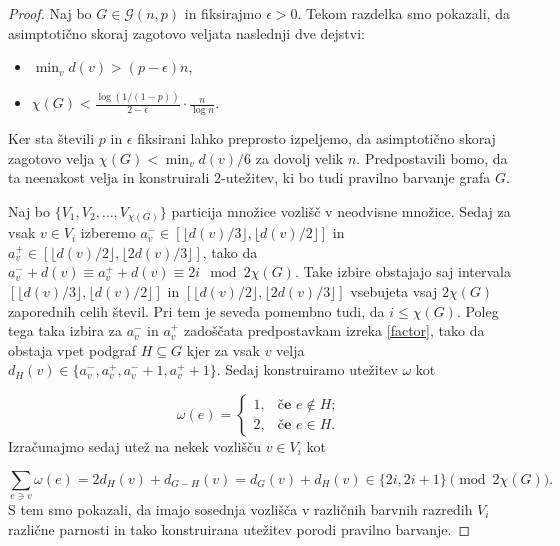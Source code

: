 \documentclass[12pt,a4paper,twoside]{article}
\theoremstyle{definition} %
\theoremstyle{plain} %
\numberwithin{equation}{section}  %
\begin{document}
\begin{proof}
Naj bo $G \in \mathcal{G}(n,p)$ in fiksirajmo $\epsilon > 0$. Tekom razdelka smo pokazali, da asimptotično skoraj zagotovo veljata naslednji dve dejstvi:
\begin{itemize}
\item $\min_v d(v) > (p- \epsilon)n$,

\item $\chi(G) < \frac{\log(1/(1-p))}{2 - \epsilon} \cdot \frac{ n}{\log n}.$
\end{itemize}
Ker sta števili $p$ in $\epsilon$ fiksirani lahko preprosto izpeljemo, da asimptotično skoraj zagotovo velja $ \chi(G) < \min_vd(v) / 6$ za dovolj velik $n$. Predpostavili bomo, da ta neenakost velja in konstruirali $2$-utežitev, ki bo tudi pravilno barvanje grafa $G$.

Naj bo $\{ V_1, V_2, \ldots, V_{\chi(G)}\}$ particija množice vozlišč v neodvisne množice. Sedaj za vsak $v \in V_i$ izberemo $a_v^- \in [ \lfloor d(v)/3 \rfloor,\lfloor d(v)/2 \rfloor]$ in $a_v^+ \in [ \lfloor d(v)/2 \rfloor,\lfloor 2d(v)/3 \rfloor]$, tako da $a_v^- + d(v) \equiv a_v^+ +  d(v) \equiv 2i \mod 2\chi(G)$. Take izbire obstajajo saj intervala $ [ \lfloor d(v)/3 \rfloor,\lfloor d(v)/2 \rfloor]$ in $ [ \lfloor d(v)/2 \rfloor,\lfloor 2d(v)/3 \rfloor]$ vsebujeta vsaj $2\chi(G)$ zaporednih celih števil. Pri tem je seveda pomembno tudi, da $i \le \chi(G)$. Poleg tega taka izbira za $a_v^-$ in $a_v^+$ zadoščata predpostavkam izreka \ref{factor}, tako da obstaja vpet podgraf $H \subseteq G$ kjer za vsak $v$ velja $d_H(v) \in \{a_v^-,a_v^+,a_v^- + 1 ,a_v^+ + 1\}$. Sedaj konstruiramo utežitev $\omega$ kot 

$$ \omega(e) = \begin{cases}
	1, & \textbf{če } e \notin H ;\\ 
	2, &\textbf{če } e \in H .
	\end{cases} $$
Izračunajmo sedaj utež na nekek vozlišču $v \in V_i$ kot

$$ \sum_{e \ni v} \omega(e) = 2 d_H(v) + d_{G-H}(v) = d_{G}(v) + d_H(v) \in \{2i, 2i + 1\} \pmod{2\chi(G)}.$$
S tem smo pokazali, da imajo sosednja vozlišča v različnih barvnih razredih $V_i$ različne parnosti in tako konstruirana utežitev porodi pravilno barvanje.
\end{proof}
\end{document}
